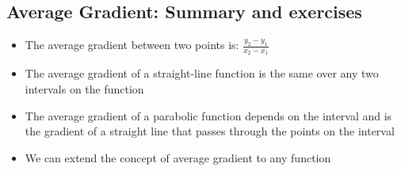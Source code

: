             \subsection{ Average Gradient: Summary and exercises}
            \nopagebreak
\label{m39240*eip-922}\begin{itemize}[noitemsep]
            \item The average gradient between two points is: $\frac{{y}_{2}-{y}_{1}}{{x}_{2}-{x}_{1}}$\item The average gradient of a straight-line function is the same over any two intervals on the function\item The average gradient of a parabolic function depends on the interval and is the gradient of a straight line that passes through the points on the interval\item We can extend the concept of average gradient to any function\end{itemize}
        \label{m39240*cid5}
